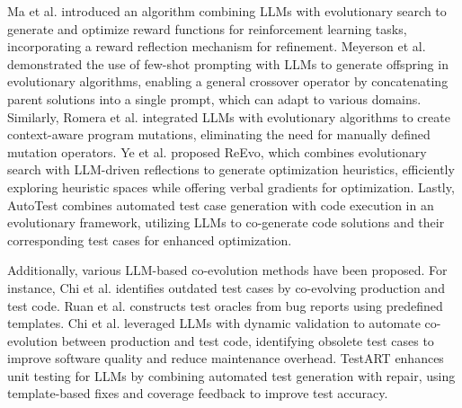 Ma et al. \cite{ma2023eureka} introduced an algorithm combining LLMs with evolutionary search to generate and optimize reward functions for reinforcement learning tasks, incorporating a reward reflection mechanism for refinement. 
Meyerson et al. \cite{meyerson2024language} demonstrated the use of few-shot prompting with LLMs to generate offspring in evolutionary algorithms, enabling a general crossover operator by concatenating parent solutions into a single prompt, which can adapt to various domains.
Similarly, Romera et al. \cite{romera2024mathematical} integrated LLMs with evolutionary algorithms to create context-aware program mutations, eliminating the need for manually defined mutation operators. 
Ye et al. \cite{ye2024reevo} proposed ReEvo, which combines evolutionary search with LLM-driven reflections to generate optimization heuristics, efficiently exploring heuristic spaces while offering verbal gradients for optimization. 
Lastly, AutoTest \cite{duan2024autotest} combines automated test case generation with code execution in an evolutionary framework, utilizing LLMs to co-generate code solutions and their corresponding test cases for enhanced optimization.

Additionally, various LLM-based co-evolution methods have been proposed. 
For instance,
Chi et al. \cite{chi2024reaccept} identifies outdated test cases by co-evolving production and test code.
Ruan et al. \cite{ruan2024evolutionary} constructs test oracles from bug reports using predefined templates.
Chi et al. \cite{chi2024reaccept} leveraged LLMs with dynamic validation to automate co-evolution between production and test code, identifying obsolete test cases to improve software quality and reduce maintenance overhead.
TestART \cite{gu2024testart} enhances unit testing for LLMs by combining automated test generation with repair, using template-based fixes and coverage feedback to improve test accuracy.